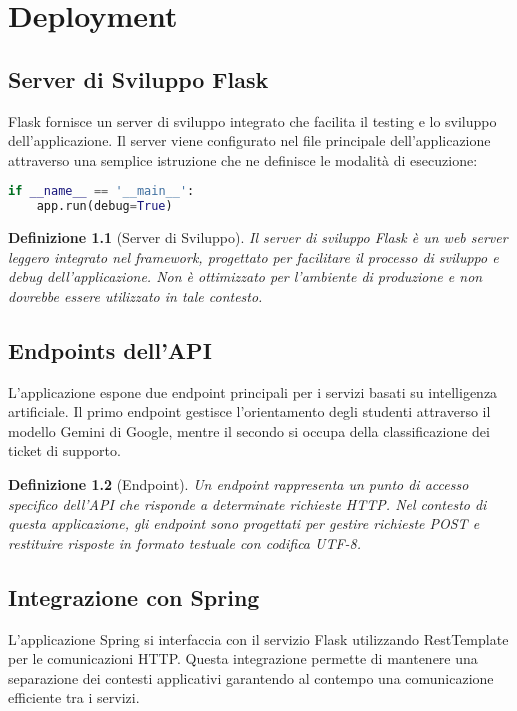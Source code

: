 \chapter{Deployment}
\newtheorem{definition}{Definizione}[chapter]

\section{Server di Sviluppo Flask}
Flask fornisce un server di sviluppo integrato che facilita il testing e lo sviluppo dell'applicazione. Il server viene configurato nel file principale dell'applicazione attraverso una semplice istruzione che ne definisce le modalità di esecuzione:

\begin{lstlisting}[language=Python, caption=Configurazione Server Flask]
if __name__ == '__main__':
    app.run(debug=True)
\end{lstlisting}

\begin{definition}[Server di Sviluppo]
Il server di sviluppo Flask è un web server leggero integrato nel framework, progettato per facilitare il processo di sviluppo e debug dell'applicazione. Non è ottimizzato per l'ambiente di produzione e non dovrebbe essere utilizzato in tale contesto.
\end{definition}

\section{Endpoints dell'API}
L'applicazione espone due endpoint principali per i servizi basati su intelligenza artificiale. Il primo endpoint gestisce l'orientamento degli studenti attraverso il modello Gemini di Google, mentre il secondo si occupa della classificazione dei ticket di supporto.
\begin{definition}[Endpoint]
Un endpoint rappresenta un punto di accesso specifico dell'API che risponde a determinate richieste HTTP. Nel contesto di questa applicazione, gli endpoint sono progettati per gestire richieste POST e restituire risposte in formato testuale con codifica UTF-8.
\end{definition}

\section{Integrazione con Spring}
L'applicazione Spring si interfaccia con il servizio Flask utilizzando RestTemplate per le comunicazioni HTTP. Questa integrazione permette di mantenere una separazione dei contesti applicativi garantendo al contempo una comunicazione efficiente tra i servizi.

